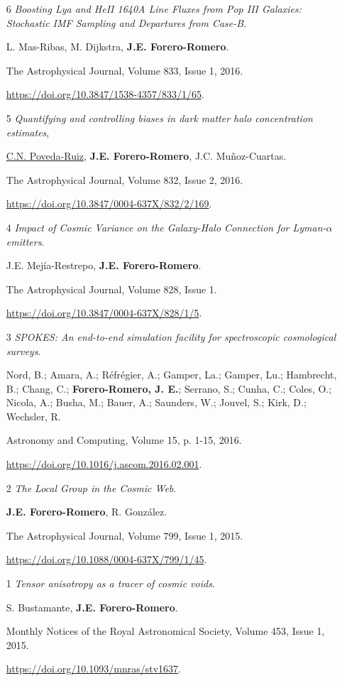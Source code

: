 \documentclass{article}
\begin{document}
\begin{itemize}
\item[6]{\it Boosting Lya and HeII 1640A Line Fluxes from Pop III
  Galaxies: Stochastic IMF Sampling and Departures from
  Case-B}. 

L. Mas-Ribas, M. Dijkstra, {\bf J.E. Forero-Romero}.

The Astrophysical Journal, Volume 833, Issue 1, 2016. 

\url{https://doi.org/10.3847/1538-4357/833/1/65}. 


\item[5]{\it Quantifying and controlling biases in dark matter halo
  concentration estimates}, 

\underline{C.N. Poveda-Ruiz}, {\bf J.E. Forero-Romero}, J.C. Mu\~noz-Cuartas. 

The Astrophysical Journal, Volume 832, Issue 2, 2016. 

\url{https://doi.org/10.3847/0004-637X/832/2/169}.

\item[4]{\it Impact of Cosmic Variance on the Galaxy-Halo Connection
  for Lyman-$\alpha$ emitters}.  

J.E. Mej\'ia-Restrepo, {\bf J.E. Forero-Romero}.

The Astrophysical Journal, Volume 828, Issue 1.

\url{https://doi.org/10.3847/0004-637X/828/1/5}.

\item[3]{\it SPOKES: An end-to-end simulation facility for
  spectroscopic cosmological surveys}.
 
	Nord, B.; Amara, A.; R\'efr\'egier, A.; Gamper, La.; Gamper, Lu.;
        Hambrecht, B.; Chang, C.; {\bf Forero-Romero, J. E.}; Serrano, S.;
        Cunha, C.; Coles, O.; Nicola, A.; Busha, M.; Bauer, A.;
        Saunders, W.; Jouvel, S.; Kirk, D.; Wechsler, R.

Astronomy and Computing, Volume 15, p. 1-15, 2016.

\url{https://doi.org/10.1016/j.ascom.2016.02.001}.

\item[2]{\it The Local Group in the Cosmic Web}.

{\bf J.E. Forero-Romero}, R. González.

The Astrophysical Journal, Volume 799, Issue 1, 2015.

\url{https://doi.org/10.1088/0004-637X/799/1/45}.

\item[1] {\it Tensor anisotropy as a tracer of cosmic voids}. 

S. Bustamante, {\bf J.E. Forero-Romero}. 

Monthly Notices of the Royal Astronomical Society, Volume 453, Issue 1, 2015.

\url{https://doi.org/10.1093/mnras/stv1637}.

\end{itemize}
\end{document}
